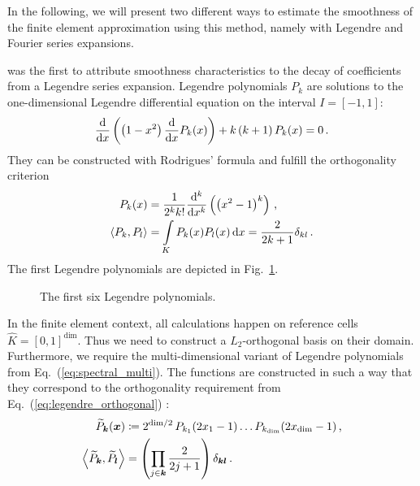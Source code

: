 In the following, we will present two different ways to estimate the smoothness of the finite element approximation using this method, namely with Legendre and Fourier series expansions.

\textcite{mavriplis1994} was the first to attribute smoothness characteristics to the decay of coefficients from a Legendre series expansion. Legendre polynomials $P_k$ are solutions to the one-dimensional Legendre differential equation on the interval $I = [-1,1]$:
\begin{align}
\frac{\mathop{}\!\mathrm{d}}{\mathop{}\!\mathrm{d}x} \left(\left(1-x^{2}\right) \frac{\mathop{}\!\mathrm{d}}{\mathop{}\!\mathrm{d}x} P_k(x)\right)+ k \left(k+1\right) P_k(x)=0 \,\text{.}
\end{align}
They can be constructed with Rodrigues' formula and fulfill the orthogonality criterion
\begin{align}
P_k(x) &= \frac{1}{2^k k!} \frac{\mathop{}\!\mathrm{d}^k}{\mathop{}\!\mathrm{d}x^k} \left( \left(x^2 - 1\right)^k \right) \,\text{,} \\
\label{eq:legendre_orthogonal} \langle P_k, P_l\rangle &= \int\limits_K P_k(x) P_l(x) \mathop{}\!\mathrm{d}x = \frac{2}{2 k+1} \delta_{k l} \,\text{.}
\end{align}
The first Legendre polynomials are depicted in Fig.~\ref{fig:legendre}. \textcite{dealiilegendre}

\begin{figure}
\centering

\caption[The first Legendre polynomials.]{The first six Legendre polynomials.}
\label{fig:legendre}
\end{figure}

In the finite element context, all calculations happen on reference cells $\widehat{K} = [0,1]^\text{dim}$. Thus we need to construct a $L_2$-orthogonal basis on their domain. Furthermore, we require the multi-dimensional variant of Legendre polynomials from Eq.~(\ref{eq:spectral_multi}). The functions are constructed in such a way that they correspond to the orthogonality requirement from Eq.~(\ref{eq:legendre_orthogonal}) \textcite{dealiilegendre}:
\begin{align}
\widetilde{P}_\tuple{k}(\vec{x}) &\coloneqq 2^{\text{dim}/2} \, P_{k_1}(2x_1 - 1) \dots P_{k_\text{dim}}(2x_\text{dim} - 1) \,\text{,} \\
\left\langle \widetilde{P}_\tuple{k}, \widetilde{P}_\tuple{l} \right\rangle &= \left(\prod\limits_{j \in \tuple{k}} \frac{2}{2j+1}\right) \delta_{\tuple{k} \tuple{l}} \,\text{.}
\end{align}

